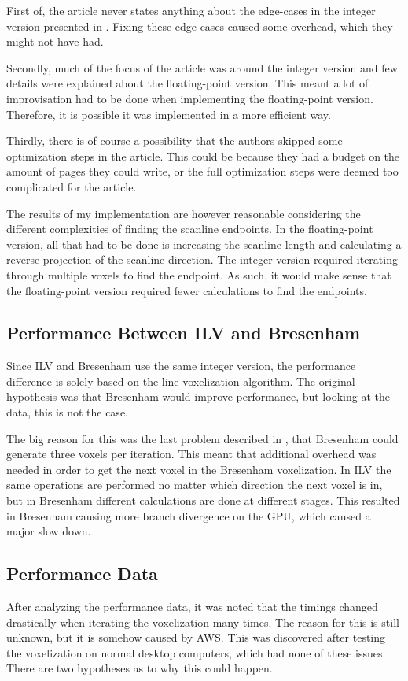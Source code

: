 First of, the article never states anything about the edge-cases in the integer version presented in .
Fixing these edge-cases caused some overhead, which they might not have had.

Secondly, much of the focus of the article was around the integer version and few details were explained about the floating-point version. 
This meant a lot of improvisation had to be done when implementing the floating-point version.
Therefore, it is possible it was implemented in a more efficient way.

Thirdly, there is of course a possibility that the authors skipped some optimization steps in the article.
This could be because they had a budget on the amount of pages they could write, or the full optimization steps were deemed too complicated for the article.

The results of my implementation are however reasonable considering the different complexities of finding the scanline endpoints.
In the floating-point version, all that had to be done is increasing the scanline length and calculating a reverse projection of the scanline direction.
The integer version required iterating through multiple voxels to find the endpoint. 
As such, it would make sense that the floating-point version required fewer calculations to find the endpoints.

\subsection{Performance Between ILV and Bresenham}
Since ILV and Bresenham use the same integer version, the performance difference is solely based on the line voxelization algorithm.
The original hypothesis was that Bresenham would improve performance, but looking at the data, this is not the case.

The big reason for this was the last problem described in , that Bresenham could generate three voxels per iteration.
This meant that additional overhead was needed in order to get the next voxel in the Bresenham voxelization.
In ILV the same operations are performed no matter which direction the next voxel is in, but in Bresenham different calculations are done at different stages.
This resulted in Bresenham causing more branch divergence on the GPU, which caused a major slow down.

\subsection{Performance Data}
After analyzing the performance data, it was noted that the timings changed drastically when iterating the voxelization many times.
The reason for this is still unknown, but it is somehow caused by AWS.
This was discovered after testing the voxelization on normal desktop computers, which had none of these issues.
There are two hypotheses as to why this could happen.

